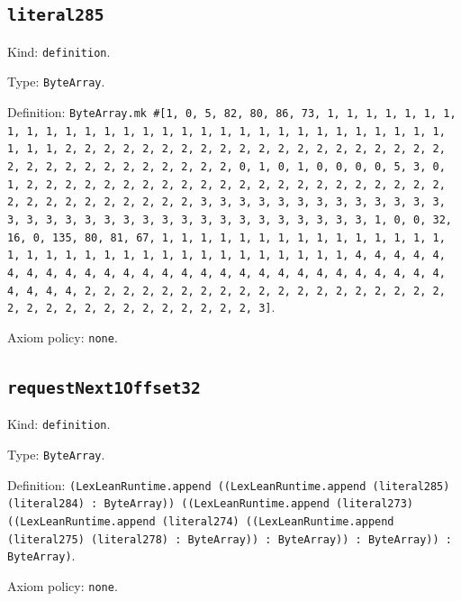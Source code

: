 \documentclass[11pt]{article}
\begin{document}
\subsection*{\texttt{literal285}}
\noindent Kind: \texttt{definition}.\par
\noindent Type: \texttt{ByteArray}.\par
\noindent Definition: \texttt{ByteArray.mk \#[1, 0, 5, 82, 80, 86, 73, 1, 1, 1, 1, 1, 1, 1, 1, 1, 1, 1, 1, 1, 1, 1, 1, 1, 1, 1, 1, 1, 1, 1, 1, 1, 1, 1, 1, 1, 1, 1, 1, 1, 2, 2, 2, 2, 2, 2, 2, 2, 2, 2, 2, 2, 2, 2, 2, 2, 2, 2, 2, 2, 2, 2, 2, 2, 2, 2, 2, 2, 2, 2, 2, 2, 0, 1, 0, 1, 0, 0, 0, 0, 5, 3, 0, 1, 2, 2, 2, 2, 2, 2, 2, 2, 2, 2, 2, 2, 2, 2, 2, 2, 2, 2, 2, 2, 2, 2, 2, 2, 2, 2, 2, 2, 2, 2, 2, 2, 3, 3, 3, 3, 3, 3, 3, 3, 3, 3, 3, 3, 3, 3, 3, 3, 3, 3, 3, 3, 3, 3, 3, 3, 3, 3, 3, 3, 3, 3, 3, 3, 1, 0, 0, 32, 16, 0, 135, 80, 81, 67, 1, 1, 1, 1, 1, 1, 1, 1, 1, 1, 1, 1, 1, 1, 1, 1, 1, 1, 1, 1, 1, 1, 1, 1, 1, 1, 1, 1, 1, 1, 1, 1, 1, 4, 4, 4, 4, 4, 4, 4, 4, 4, 4, 4, 4, 4, 4, 4, 4, 4, 4, 4, 4, 4, 4, 4, 4, 4, 4, 4, 4, 4, 4, 4, 4, 2, 2, 2, 2, 2, 2, 2, 2, 2, 2, 2, 2, 2, 2, 2, 2, 2, 2, 2, 2, 2, 2, 2, 2, 2, 2, 2, 2, 2, 2, 2, 2, 3]}.\par
\noindent Axiom policy: \texttt{none}.\par
\subsection*{\texttt{requestNext1Offset32}}
\noindent Kind: \texttt{definition}.\par
\noindent Type: \texttt{ByteArray}.\par
\noindent Definition: \texttt{(LexLeanRuntime.append ((LexLeanRuntime.append (literal285) (literal284) : ByteArray)) ((LexLeanRuntime.append (literal273) ((LexLeanRuntime.append (literal274) ((LexLeanRuntime.append (literal275) (literal278) : ByteArray)) : ByteArray)) : ByteArray)) : ByteArray)}.\par
\noindent Axiom policy: \texttt{none}.\par
\end{document}
